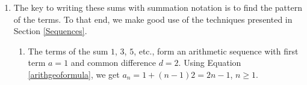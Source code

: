 \documentclass{ximera}
\begin{document}
\begin{example}
\begin{enumerate}
\begin{enumerate}
\item  Proceeding as in (a), we replace every occurrence of $n$ with the values $0$ through $4$.  We recall the factorials, $n!$ as defined in number Example \ref{seqex1}, number \ref{factorialintroex} and get: 

\[ \begin{array}{rcl}

\displaystyle{\displaystyle{\sum_{n=0}^{4} \frac{n!}{2}}} & = & \frac{0!}{2} + \frac{1!}{2} + \frac{2!}{2} + \frac{3!}{2} = \frac{4!}{2} \\  
																								& = & \frac{1}{2} + \frac{1}{2} + \frac{2 \cdot 1}{2} + \frac{3 \cdot 2 \cdot 1}{2} + \frac{4 \cdot 3 \cdot 2 \cdot 1 }{2} \\  
																								& = & \frac{1}{2} + \frac{1}{2} + 1 + 3 + 12 \\  
																								& = & 17 \\
\end{array}\]

\item  We proceed as before, replacing the index $n$, but \emph{not} the variable $x$, with the values $1$ through $5$ and adding the resulting terms.

\[ \begin{array}{rcl}

\displaystyle{\sum_{n=1}^{5} \frac{(-1)^{n+1}}{n} (x-1)^n} & = &  \frac{(-1)^{1+1}}{1} (x-1)^1 + \frac{(-1)^{2+1}}{2} (x-1)^2 + \frac{(-1)^{3+1}}{3} (x-1)^3 \\ && + \frac{(-1)^{1+4}}{4} (x-1)^4 + \frac{(-1)^{1+5}}{5} (x-1)^5 \\  
& = & (x-1) - \frac{(x-1)^2}{2} +  \frac{(x-1)^3}{3} -  \frac{(x-1)^4}{4} +  \frac{(x-1)^5}{5} \\
\end{array} \]

\end{enumerate}

\item  The key to writing these sums with summation notation is to find the pattern of the terms. To that end, we make good use of the techniques presented in Section \ref{Sequences}.

\begin{enumerate}

\item The terms of the sum $1$, $3$, $5$, etc., form an arithmetic sequence with first term $a = 1$ and common difference $d = 2$.  Using Equation \ref{arithgeoformula}, we get $a_{n} = 1 + (n-1)2 = 2n-1$, $n \geq 1$.  


\end{enumerate}
\end{enumerate}
\end{example}
\end{document}

